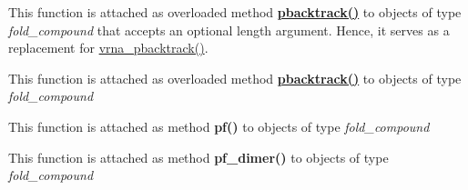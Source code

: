 \begin{DoxyRefList}
\item[\label{wrappers__wrappers000087}%
\Hypertarget{wrappers__wrappers000087}%
Global \mbox{\hyperlink{group__subopt__stochbt_ga901fe42a33b07be083421741bf7dc610}{vrna\+\_\+pbacktrack}} (vrna\+\_\+fold\+\_\+compound\+\_\+t $\ast$vc)]This function is attached as overloaded method {\bfseries \mbox{\hyperlink{group__subopt__stochbt_gac03ca6db186bb3bf0a2a326d7fb3ba03}{pbacktrack()}}} to objects of type {\itshape fold\+\_\+compound} that accepts an optional {\ttfamily length} argument. Hence, it serves as a replacement for \mbox{\hyperlink{group__subopt__stochbt_ga901fe42a33b07be083421741bf7dc610}{vrna\+\_\+pbacktrack()}}.  
\item[\label{wrappers__wrappers000086}%
\Hypertarget{wrappers__wrappers000086}%
Global \mbox{\hyperlink{group__subopt__stochbt_ga347375a4da8bdff74639529847f97d4f}{vrna\+\_\+pbacktrack5}} (vrna\+\_\+fold\+\_\+compound\+\_\+t $\ast$vc, int length)]This function is attached as overloaded method {\bfseries \mbox{\hyperlink{group__subopt__stochbt_gac03ca6db186bb3bf0a2a326d7fb3ba03}{pbacktrack()}}} to objects of type {\itshape fold\+\_\+compound}  
\item[\label{wrappers__wrappers000083}%
\Hypertarget{wrappers__wrappers000083}%
Global \mbox{\hyperlink{group__pf__fold_ga29e256d688ad221b78d37f427e0e99bc}{vrna\+\_\+pf}} (vrna\+\_\+fold\+\_\+compound\+\_\+t $\ast$vc, char $\ast$structure)]This function is attached as method {\bfseries pf()} to objects of type {\itshape fold\+\_\+compound}  
\item[\label{wrappers__wrappers000084}%
\Hypertarget{wrappers__wrappers000084}%
Global \mbox{\hyperlink{group__pf__cofold_ga4e5c7d06c302a7c59fc0d64dc142ca63}{vrna\+\_\+pf\+\_\+dimer}} (vrna\+\_\+fold\+\_\+compound\+\_\+t $\ast$vc, char $\ast$structure)]This function is attached as method {\bfseries pf\+\_\+dimer()} to objects of type {\itshape fold\+\_\+compound}  
\item[\label{wrappers__wrappers000018}%
\Hypertarget{wrappers__wrappers000018}%
Global \mbox{\hyperlink{group__soft__constraints_gaf162aedac7422f2eb16ea030f47d2f4b}{vrna\+\_\+sc\+\_\+add\+\_\+bp}} (vrna\+\_\+fold\+\_\+compound\+\_\+t $\ast$vc, int i, int j, F\+L\+T\+\_\+\+O\+R\+\_\+\+D\+BL energy, unsigned int options)]


\end{DoxyRefList}
